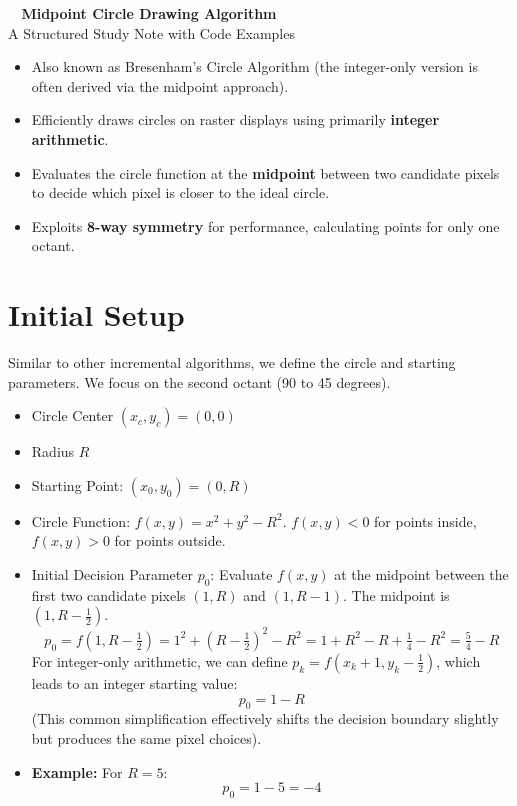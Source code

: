 \documentclass[12pt, a4paper]{article}
\begin{document}
\begin{tcolorbox}[
    colback=RoyalBlue!10!white,
    colframe=RoyalBlue!75!black,
    sharp corners,
    boxrule=1pt,
    center title
    ]
    {\Huge \bfseries \faBullseye~ Midpoint Circle Drawing Algorithm} \\[0.2cm] %
    {\large A Structured Study Note with Code Examples}
\end{tcolorbox}
\vspace{0.5cm}

\begin{tcolorbox}[
    colback=yellow!10!white,
    colframe=orange!75!black,
    title=\faStickyNote~ Quick Notes,
    fonttitle=\bfseries\large
    ]
    \begin{itemize}
        \item Also known as Bresenham's Circle Algorithm (the integer-only version is often derived via the midpoint approach).
        \item Efficiently draws circles on raster displays using primarily \textbf{integer arithmetic}.
        \item Evaluates the circle function at the \textbf{midpoint} between two candidate pixels to decide which pixel is closer to the ideal circle.
        \item Exploits \textbf{8-way symmetry} for performance, calculating points for only one octant.
    \end{itemize}
\end{tcolorbox}

\section{Initial Setup}
Similar to other incremental algorithms, we define the circle and starting parameters. We focus on the second octant (90 to 45 degrees).
\begin{itemize}
    \item Circle Center $(x_c, y_c) = (0, 0)$
    \item Radius $R$
    \item Starting Point: $(x_0, y_0) = (0, R)$
    \item Circle Function: $f(x, y) = x^2 + y^2 - R^2$. $f(x,y) < 0$ for points inside, $f(x,y) > 0$ for points outside.
    \item Initial Decision Parameter $p_0$: Evaluate $f(x, y)$ at the midpoint between the first two candidate pixels $(1, R)$ and $(1, R-1)$. The midpoint is $(1, R - \frac{1}{2})$.
    \[
        p_0 = f(1, R - \tfrac{1}{2}) = 1^2 + (R - \tfrac{1}{2})^2 - R^2 = 1 + R^2 - R + \tfrac{1}{4} - R^2 = \tfrac{5}{4} - R
    \]
    For integer-only arithmetic, we can define $p_k = f(x_k + 1, y_k - \frac{1}{2})$, which leads to an integer starting value:
    \[ p_0 = 1 - R \]
    (This common simplification effectively shifts the decision boundary slightly but produces the same pixel choices).
    \item \textbf{Example:} For $R = 5$:
    \[
        p_0 = 1 - 5 = -4
    \]
\end{itemize}
\end{document}
